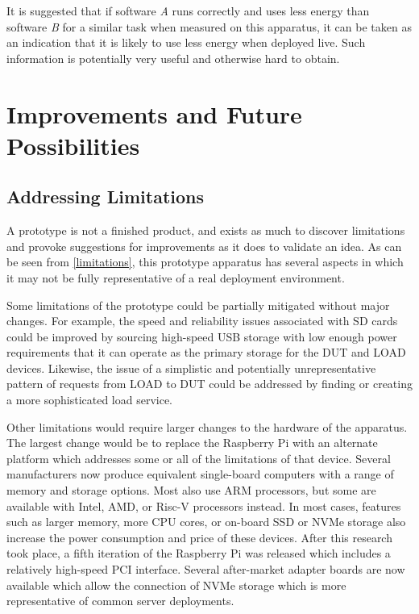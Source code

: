 It is suggested that if software \emph{A} runs correctly and uses less energy than software \emph{B} for a similar task when measured on this apparatus, it can be taken as an indication that it is likely to use less energy when deployed live. Such information is potentially very useful and otherwise hard to obtain.

\section{Improvements and Future Possibilities}
\label{Improvements}

\subsection{Addressing Limitations}

A prototype is not a finished product, and exists as much to discover limitations and provoke suggestions for improvements as it does to validate an idea. As can be seen from \autoref{limitations}, this prototype apparatus has several aspects in which it may not be fully representative of a real deployment environment.

Some limitations of the prototype could be partially mitigated without major changes. For example, the speed and reliability issues associated with SD cards could be improved by sourcing high-speed USB storage with low enough power requirements that it can operate as the primary storage for the DUT and LOAD devices. Likewise, the issue of a simplistic and potentially unrepresentative pattern of requests from LOAD to DUT could be addressed by finding or creating a more sophisticated load service.

Other limitations would require larger changes to the hardware of the apparatus. The largest change would be to replace the Raspberry Pi with an alternate platform which addresses some or all of the limitations of that device. Several manufacturers now produce equivalent single-board computers with a range of memory and storage options. Most also use ARM processors, but some are available with Intel, AMD, or Risc-V processors instead. In most cases, features such as larger memory, more CPU cores, or on-board SSD or NVMe storage also increase the power consumption and price of these devices. After this research took place, a fifth iteration of the Raspberry Pi was released which includes a relatively high-speed PCI interface. Several after-market adapter boards are now available which allow the connection of NVMe storage which is more representative of common server deployments.

